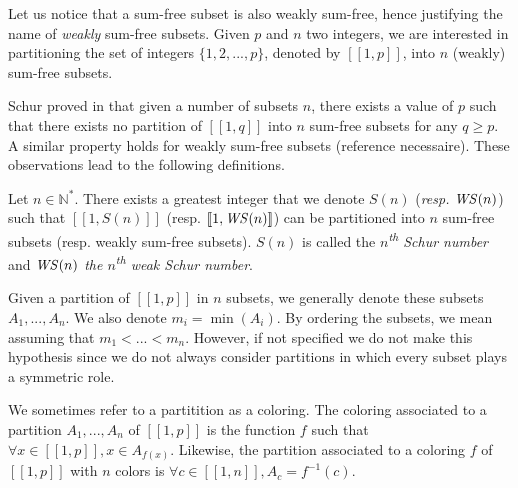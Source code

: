 Let us notice that a sum-free subset is also weakly sum-free, hence justifying the name of \textit{weakly} sum-free
subsets. Given \(p\) and \(n\) two integers, we are interested in partitioning the set of integers \(\{1, 2, ..., p\}\), 
denoted by \([\![1,p]\!]\), into \(n\) (weakly) sum-free subsets.

\par
Schur proved in \cite{Schur1917} that given a number of subsets \(n\), there exists a value of \(p\)
such that there exists no partition of \([\![1,q]\!]\) into \(n\) sum-free subsets for any \(q \geqslant p\). A similar
property holds for weakly sum-free subsets (reference necessaire). These observations lead to the following definitions.

\begin{definition}
Let \(n \in \mathbb{N}^*\). There exists a greatest integer that we denote \(S(n)\) (\textit{resp. \(\mathit{WS} (n)\)}) such that
\([\![1,S(n)]\!]\) (resp. \([\![1, \mathit{WS} (n)]\!]\)) can be partitioned into \(n\) sum-free subsets (resp. weakly sum-free
subsets). \(S(n)\) is called the \textit{\(n\)\textsuperscript{th} Schur number} and \textit{\(\mathit{WS} (n)\) the
\(n\)\textsuperscript{th} weak
Schur number}.
\end{definition}

Given a partition of \([\![1, p]\!]\) in \(n\) subsets, we generally denote these subsets \(A_1, ..., A_n\). We also denote
\(m_i = \min(A_i)\). By ordering the subsets, we mean assuming that \(m_1 < ... < m_n\). However, if not specified we do 
not make this hypothesis since we do not always consider partitions in which every subset plays a symmetric role.

\begin{definition}
We sometimes refer to a partitition as a coloring. The coloring associated to a partition \(A_1, ..., A_n\) of
\([\![1, p]\!]\) is the function \(f\) such that \(\forall x \in [\![1, p]\!], x \in A_{f(x)}\). Likewise, the partition associated to
a coloring \(f\) of \([\![1, p]\!]\) with \(n\) colors is \(\forall c \in [\![1, n]\!], A_c = f^{-1}(c)\).
\end{definition}
